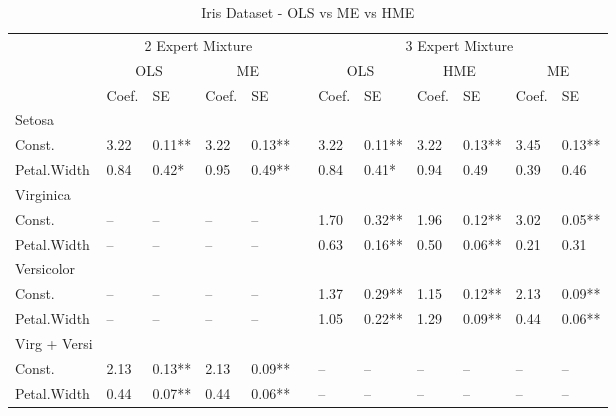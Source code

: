 \documentclass[12pt]{article}
\theoremstyle{definition}
\begin{document}
\begin{landscape}
\begin{table} 
	\caption{Iris Dataset - OLS vs ME vs HME}
	\begin{threeparttable}
		\begin{tabular}[l]{l l l l l l l l l l l l}
  \cmidrule{1-12}

  & \multicolumn{4}{c}{2 Expert Mixture} & & \multicolumn{6}{c}{3 Expert Mixture} \\
  \cmidrule(r){2-5}  \cmidrule(r){7-12}
  & \multicolumn{2}{c}{OLS}  & \multicolumn{2}{c}{ME} & & \multicolumn{2}{c}{OLS}  & \multicolumn{2}{c}{HME}  & \multicolumn{2}{c}{ME} \\
  \cmidrule(r){2-3}  \cmidrule(r){4-5}  \cmidrule(r){7-8}  \cmidrule(r){9-10}  \cmidrule(r){11-12}
  & Coef. & SE & Coef. & SE && Coef. & SE & Coef. & SE & Coef. & SE     \\
  \cmidrule{1-12}
  
  Setosa \\
  \cmidrule(r){1-1}
  Const.             & 3.22 & 0.11** & 3.22 & 0.13** && 3.22  & 0.11** & 3.22 & 0.13** & 3.45 & 0.13**       \\
  Petal.Width        & 0.84 & 0.42*  & 0.95 & 0.49** && 0.84  & 0.41*  & 0.94 & 0.49   & 0.39 & 0.46         \\[0.3cm]
  
  Virginica \\
  \cmidrule(r){1-1}
  Const.             & --   & --     & --   & --     && 1.70  & 0.32** & 1.96 & 0.12** & 3.02 & 0.05**       \\
  Petal.Width        & --   & --     & --   & --     && 0.63  & 0.16** & 0.50 & 0.06** & 0.21 & 0.31         \\[0.3cm]
  
  Versicolor \\
  \cmidrule(r){1-1}
  Const.             & --   & --     & --   & --     && 1.37  & 0.29** & 1.15 & 0.12** & 2.13 & 0.09**       \\
  Petal.Width        & --   & --     & --   & --     && 1.05  & 0.22** & 1.29 & 0.09** & 0.44 & 0.06**       \\[0.3cm]

  Virg + Versi \\
  \cmidrule(r){1-1}
  Const.             & 2.13 & 0.13** & 2.13 & 0.09** && --    & --     & --   & --     & --   & --       \\
  Petal.Width        & 0.44 & 0.07** & 0.44 & 0.06** && --    & --     & --   & --     & --   & --       \\[0.3cm]


\end{tabular}
\end{threeparttable}
\end{table}
\end{landscape}
\end{document}

